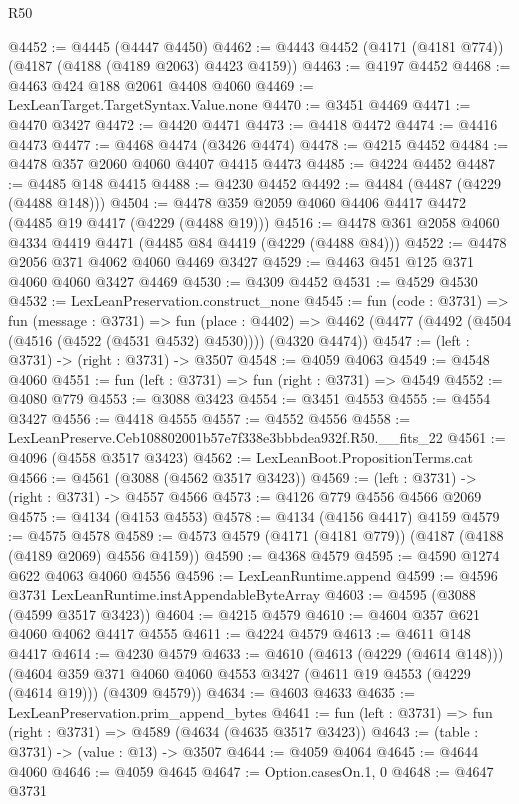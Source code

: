 \begin{lexlean}{R50}
\begin{coremodule}
@4452 := @4445 (@4447 @4450)
@4462 := @4443 @4452 (@4171 (@4181 @774)) (@4187 (@4188 (@4189 @2063) @4423 @4159))
@4463 := @4197 @4452
@4468 := @4463 @424 @188 @2061 @4408 @4060
@4469 := LexLeanTarget.TargetSyntax.Value.none
@4470 := @3451 @4469
@4471 := @4470 @3427
@4472 := @4420 @4471
@4473 := @4418 @4472
@4474 := @4416 @4473
@4477 := @4468 @4474 (@3426 @4474)
@4478 := @4215 @4452
@4484 := @4478 @357 @2060 @4060 @4407 @4415 @4473
@4485 := @4224 @4452
@4487 := @4485 @148 @4415
@4488 := @4230 @4452
@4492 := @4484 (@4487 (@4229 (@4488 @148)))
@4504 := @4478 @359 @2059 @4060 @4406 @4417 @4472 (@4485 @19 @4417 (@4229 (@4488 @19)))
@4516 := @4478 @361 @2058 @4060 @4334 @4419 @4471 (@4485 @84 @4419 (@4229 (@4488 @84)))
@4522 := @4478 @2056 @371 @4062 @4060 @4469 @3427
@4529 := @4463 @451 @125 @371 @4060 @4060 @3427 @4469
@4530 := @4309 @4452
@4531 := @4529 @4530
@4532 := LexLeanPreservation.construct_none
@4545 := fun (code : @3731) =>
  fun (message : @3731) =>
  fun (place : @4402) =>
  @4462 (@4477 (@4492 (@4504 (@4516 (@4522 (@4531 @4532) @4530)))) (@4320 @4474))
@4547 := (left : @3731) -> (right : @3731) -> @3507
@4548 := @4059 @4063
@4549 := @4548 @4060
@4551 := fun (left : @3731) => fun (right : @3731) => @4549
@4552 := @4080 @779
@4553 := @3088 @3423
@4554 := @3451 @4553
@4555 := @4554 @3427
@4556 := @4418 @4555
@4557 := @4552 @4556
@4558 := LexLeanPreserve.Ceb108802001b57e7f338e3bbbdea932f.R50.__fits_22
@4561 := @4096 (@4558 @3517 @3423)
@4562 := LexLeanBoot.PropositionTerms.cat
@4566 := @4561 (@3088 (@4562 @3517 @3423))
@4569 := (left : @3731) -> (right : @3731) -> @4557 @4566
@4573 := @4126 @779 @4556 @4566 @2069
@4575 := @4134 (@4153 @4553)
@4578 := @4134 (@4156 @4417) @4159
@4579 := @4575 @4578
@4589 := @4573 @4579 (@4171 (@4181 @779)) (@4187 (@4188 (@4189 @2069) @4556 @4159))
@4590 := @4368 @4579
@4595 := @4590 @1274 @622 @4063 @4060 @4556
@4596 := LexLeanRuntime.append
@4599 := @4596 @3731 LexLeanRuntime.instAppendableByteArray
@4603 := @4595 (@3088 (@4599 @3517 @3423))
@4604 := @4215 @4579
@4610 := @4604 @357 @621 @4060 @4062 @4417 @4555
@4611 := @4224 @4579
@4613 := @4611 @148 @4417
@4614 := @4230 @4579
@4633 := @4610
    (@4613 (@4229 (@4614 @148)))
    (@4604 @359 @371 @4060 @4060 @4553 @3427 (@4611 @19 @4553 (@4229 (@4614 @19))) (@4309 @4579))
@4634 := @4603 @4633
@4635 := LexLeanPreservation.prim_append_bytes
@4641 := fun (left : @3731) => fun (right : @3731) => @4589 (@4634 (@4635 @3517 @3423))
@4643 := (table : @3731) -> (value : @13) -> @3507
@4644 := @4059 @4064
@4645 := @4644 @4060
@4646 := @4059 @4645
@4647 := Option.casesOn.{1, 0}
@4648 := @4647 @3731

\end{coremodule}
\end{lexlean}
